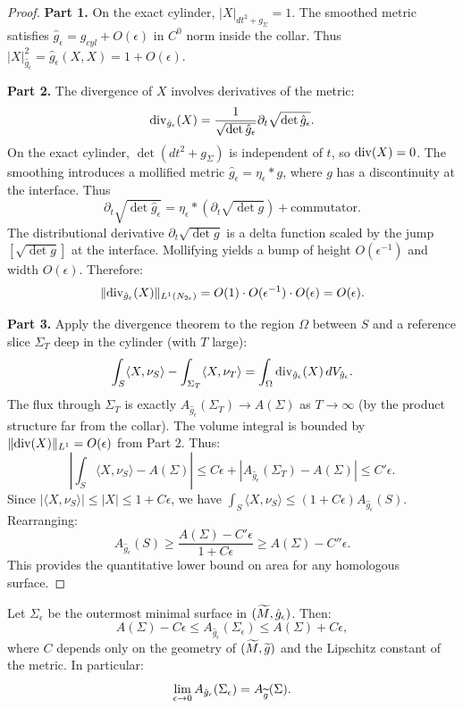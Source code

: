 \begin{proof}
\textbf{Part 1.} On the exact cylinder, $|X|_{dt^2+g_\Sigma} = 1$. The smoothed metric satisfies $\hat{g}_\epsilon = g_{cyl} + O(\epsilon)$ in $C^0$ norm inside the collar. Thus $|X|_{\hat{g}_\epsilon}^2 = \hat{g}_\epsilon(X,X) = 1 + O(\epsilon)$.

\textbf{Part 2.} The divergence of $X$ involves derivatives of the metric:
\[
    \mathrm{div}_{\hat{g}_\epsilon}(X) = \frac{1}{\sqrt{\det \hat{g}_\epsilon}} \partial_t \sqrt{\det \hat{g}_\epsilon}.
\]
On the exact cylinder, $\det(dt^2 + g_\Sigma)$ is independent of $t$, so $\mathrm{div}(X) = 0$. The smoothing introduces a mollified metric $\hat{g}_\epsilon = \eta_\epsilon * g$, where $g$ has a discontinuity at the interface. Thus
\[
    \partial_t \sqrt{\det \hat{g}_\epsilon} = \eta_\epsilon * (\partial_t \sqrt{\det g}) + \text{commutator}.
\]
The distributional derivative $\partial_t \sqrt{\det g}$ is a delta function scaled by the jump $[\sqrt{\det g}]$ at the interface. Mollifying yields a bump of height $O(\epsilon^{-1})$ and width $O(\epsilon)$. Therefore:
\[
    \|\mathrm{div}_{\hat{g}_\epsilon}(X)\|_{L^1(N_{2\epsilon})} = O(1) \cdot O(\epsilon^{-1}) \cdot O(\epsilon) = O(\epsilon).
\]

\textbf{Part 3.} Apply the divergence theorem to the region $\Omega$ between $S$ and a reference slice $\Sigma_T$ deep in the cylinder (with $T$ large):
\[
    \int_S \langle X, \nu_S \rangle - \int_{\Sigma_T} \langle X, \nu_T \rangle = \int_\Omega \mathrm{div}_{\hat{g}_\epsilon}(X) \, dV_{\hat{g}_\epsilon}.
\]
The flux through $\Sigma_T$ is exactly $A_{\hat{g}_\epsilon}(\Sigma_T) \to A(\Sigma)$ as $T \to \infty$ (by the product structure far from the collar). The volume integral is bounded by $\|\mathrm{div}(X)\|_{L^1} = O(\epsilon)$ from Part 2. Thus:
\[
    \left| \int_S \langle X, \nu_S \rangle - A(\Sigma) \right| \le C\epsilon + |A_{\hat{g}_\epsilon}(\Sigma_T) - A(\Sigma)| \le C'\epsilon.
\]
Since $|\langle X, \nu_S \rangle| \le |X| \le 1 + C\epsilon$, we have $\int_S \langle X, \nu_S \rangle \le (1+C\epsilon) A_{\hat{g}_\epsilon}(S)$. Rearranging:
\[
    A_{\hat{g}_\epsilon}(S) \ge \frac{A(\Sigma) - C'\epsilon}{1 + C\epsilon} \ge A(\Sigma) - C''\epsilon.
\]
This provides the quantitative lower bound on area for any homologous surface.
\end{proof}

\begin{corollary}\label{cor:SharpAreaStability}
Let $\Sigma_\epsilon$ be the outermost minimal surface in $(\widetilde{M}, \hat{g}_\epsilon)$. Then:
\[
    A(\Sigma) - C\epsilon \le A_{\hat{g}_\epsilon}(\Sigma_\epsilon) \le A(\Sigma) + C\epsilon,
\]
where $C$ depends only on the geometry of $(\widetilde{M}, \widetilde{g})$ and the Lipschitz constant of the metric. In particular:
\[
    \lim_{\epsilon \to 0} A_{\hat{g}_\epsilon}(\Sigma_\epsilon) = A_{\widetilde{g}}(\Sigma).
\]
\end{corollary}

